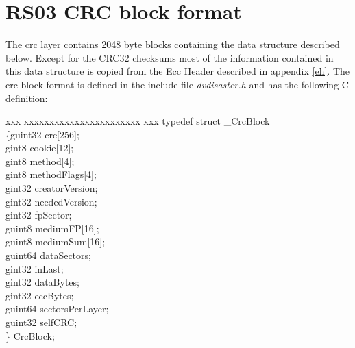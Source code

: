 
\newpage
\section{RS03 CRC block format}
\label{crc-block}

The crc layer contains 2048 byte blocks containing the data structure
described below. Except for the CRC32 checksums most of the information
contained in this data structure is copied from the Ecc Header described
in appendix \ref{eh}. The crc block format is defined in the include 
file {\em dvdisaster.h} and has the following C definition:

\begin{tabbing}
 xxx \= xxxxxxxxxxxxxxxxxxxxxxx \= xxx \kill
typedef struct \_CrcBlock \\
\{\>guint32 crc[256];           \\
\> gint8 cookie[12];            \\
\> gint8 method[4];             \\
\> gint8 methodFlags[4];        \\
\> gint32 creatorVersion;       \\
\> gint32 neededVersion;        \\
\> gint32 fpSector;             \\
\> guint8 mediumFP[16];         \\ 
\> guint8 mediumSum[16];        \\
\> guint64 dataSectors;         \\
\> gint32 inLast;               \\
\> gint32 dataBytes;            \\
\> gint32 eccBytes;             \\
\> guint64 sectorsPerLayer;     \\
\> guint32 selfCRC;             \\
\} CrcBlock;
\end{tabbing}

